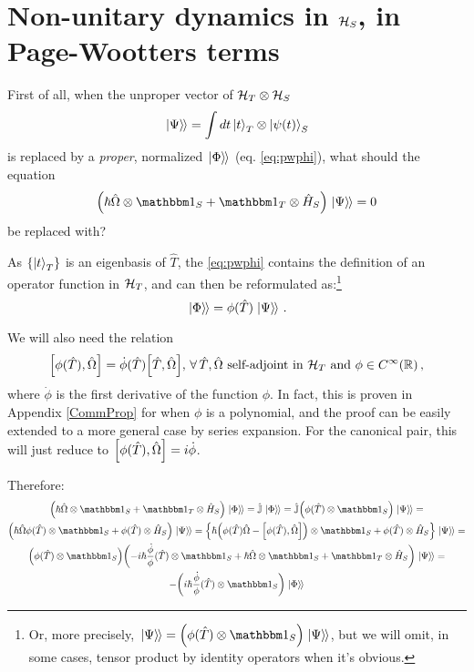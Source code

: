 \section{Non-unitary dynamics in $\mathcal{H}_S$, in Page-Wootters terms}

First of all,
when the unproper vector of $\mathcal{H}_T \otimes \mathcal{H}_S$
\begin{equation}
  \left.\left| \Psi \right\rangle\hspace{-0.115em}\right\rangle = \int dt \ket{t}_{T} \otimes \ket{\psi(t)}_{S}
\end{equation}
is replaced by a \emph{proper}, normalized $\left.\left| \Phi \right\rangle\hspace{-0.115em}\right\rangle$ (eq. \ref{eq:pwphi}),
what should the equation
\begin{equation}
  \qty(\hbar\hat{\Omega} \ox \idop_S + \idop_T \ox \hat{H}_S)\dket{\Psi} = 0
\end{equation}
be replaced with?

As $\left\{\ket{t}_T\right\}$ is an eigenbasis of $\hat{T}$, the \eqref{eq:pwphi}
contains the definition of an operator function in $\mathcal{H}_T$,
and can then be reformulated as:\footnote{
  Or, more precisely, $\dket{\Psi} = \qty( \phi(\hat{T}) \ox \idop_S ) \dket{\Psi}$,
  but we will omit, in some cases,
  tensor product by identity operators
  when it's obvious.
}
\begin{equation}
  \left.\left| \Phi \right\rangle\hspace{-0.115em}\right\rangle = \phi(\hat{T})\left.\left| \Psi \right\rangle\hspace{-0.115em}\right\rangle \, \text{.}
\end{equation}

We will also need the relation
\begin{equation}
  \comm{\phi(\hat{T})}{\hat{\Omega}} = \dot{\phi}(\hat{T}) \comm{\hat{T}}{\hat{\Omega}}, \,
    \forall \, \hat{T}, \hat{\Omega} \text{ self-adjoint in } \hilb{H}_T \text{ and } \phi \in C^{\infty}(\mathbb{R}) \, \text{,} 
\end{equation}
where $\dot{\phi}$ is the first derivative of the function $\phi$.
In fact, this is proven in Appendix \ref{CommProp} for when $\phi$ is a polynomial,
and the proof can be easily extended to a more general case by series expansion.
For the canonical pair, this will just reduce to $\comm{\phi(\hat{T})}{\hat{\Omega}} = i \dot{\phi}$.

Therefore:
\begin{multline}
  \qty( \hbar\hat{\Omega} \ox \idop_S + \idop_T \ox \hat{H}_S ) \dket{\Phi} =
  \hat{\mathbb{J}}\dket{\Phi} =
  \hat{\mathbb{J}} \qty( \phi(\hat{T}) \ox \idop_S) \dket{\Psi} =
  \\
  \qty( \hbar\hat{\Omega}\phi(\hat{T}) \ox \idop_S + \phi(\hat{T}) \ox \hat{H}_S )\dket{\Psi} =
  \qty{
    \hbar\qty( \phi(\hat{T})\hat{\Omega} - \comm{\phi(\hat{T})}{\hat{\Omega}} ) \ox \idop_S +
    \phi(\hat{T}) \ox \hat{H}_S
  }\dket{\Psi} =
  \\
  \qty(
    \phi(\hat{T}) \ox \idop_S
  )
  \qty(
    - i \hbar \frac{\dot{\phi}}{\phi} (\hat{T}) \ox \idop_S
    + \hbar\hat{\Omega} \ox \idop_S
    + \idop_T \ox \hat{H}_S
  ) \dket{\Psi} =
  \\
  - \qty( i \hbar \frac{\dot{\phi}}{\phi} (\hat{T}) \ox \idop_S ) \dket{\Phi}
\end{multline}